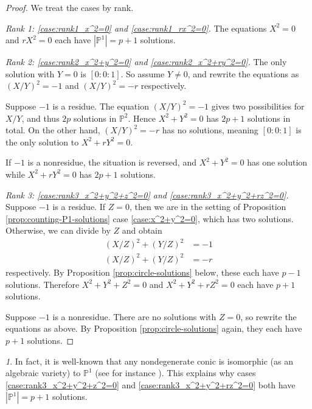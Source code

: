 \documentclass[10pt,a4paper]{amsart}
\numberwithin{equation}{section}
\numberwithin{figure}{section}
\theoremstyle{definition}
\theoremstyle{remark}
\newtheorem*{rem*}{\protect\remarkname}
\theoremstyle{plain}
\theoremstyle{plain}
\theoremstyle{definition}
\theoremstyle{plain}
\theoremstyle{plain}
\providecommand{\remarkname}{Remark}
\renewcommand{\P}{\mathbb{P}}
\begin{document}
	\begin{proof} We treat the cases by rank.
		
		\textit{Rank 1: \eqref{case:rank1_x^2=0} and \eqref{case:rank1_rx^2=0}.} 
		The equations $X^2 = 0$ and $rX^2 = 0$ each have $|\P^1|=p + 1$ solutions.
		
		\textit{Rank 2: \eqref{case:rank2_x^2+y^2=0} and \eqref{case:rank2_x^2+ry^2=0}.} 
		The only solution with $Y=0$ is $[0:0:1]$. So assume $Y \neq 0$, and rewrite the 
		equations as $(X/Y)^2 = -1$ and $(X/Y)^2 = -r$ respectively.
		
		Suppose $-1$ is a residue. The equation $(X/Y)^2 = -1$ gives
		two possibilities for $X/Y$, and thus $2p$ solutions in $\mathbb{P}^2$. Hence
		$X^2 + Y^2 = 0$ has $2p + 1$ solutions in total. On the other hand, $(X/Y)^2 =
		-r$ has no solutions, meaning $[0:0:1]$ is the only solution to $X^2 + rY^2 =
		0$.
		
		If $-1$ is a nonresidue, the situation is reversed, and $X^2 + Y^2 = 0$ has one
		solution while $X^2 + rY^2 = 0$ has $2p + 1$ solutions.
		
		\textit{Rank 3: \eqref{case:rank3_x^2+y^2+z^2=0} and \eqref{case:rank3_x^2+y^2+rz^2=0}.} 
		Suppose $-1$ is a residue. If $Z = 0$, then we are in the setting of
		Proposition \ref{prop:counting-P1-solutions} case \eqref{case:x^2+y^2=0}, which has two
		solutions. Otherwise, we can divide by $Z$ and obtain 
		\begin{align*} 
		(X/Z)^2 + (Y/Z)^2 &= -1 \\ 
		(X/Z)^2 + (Y/Z)^2 &= -r 
		\end{align*} 
		respectively. By Proposition \ref{prop:circle-solutions} below, these each have $p - 1$
		solutions. Therefore $X^2 + Y^2 + Z^2 = 0$ and $X^2 + Y^2 + rZ^2 = 0$ each have
		$p+1$ solutions.
		
		Suppose $-1$ is a nonresidue. There are no solutions with $Z=0$, so rewrite the
		equations as above. By Proposition \ref{prop:circle-solutions} again, they each
		have $p + 1$ solutions.
	\end{proof}

    \begin{rem*}
      In fact, it is well-known that any nondegenerate conic is isomorphic (as an algebraic variety) to $\P^1$ (see for instance \cite[Prop.~19.3.1]{vakil}). This explains why cases \eqref{case:rank3_x^2+y^2+z^2=0} and \eqref{case:rank3_x^2+y^2+rz^2=0} both have $|\P^1|=p+1$ solutions.
    \end{rem*}
	
\end{document}
